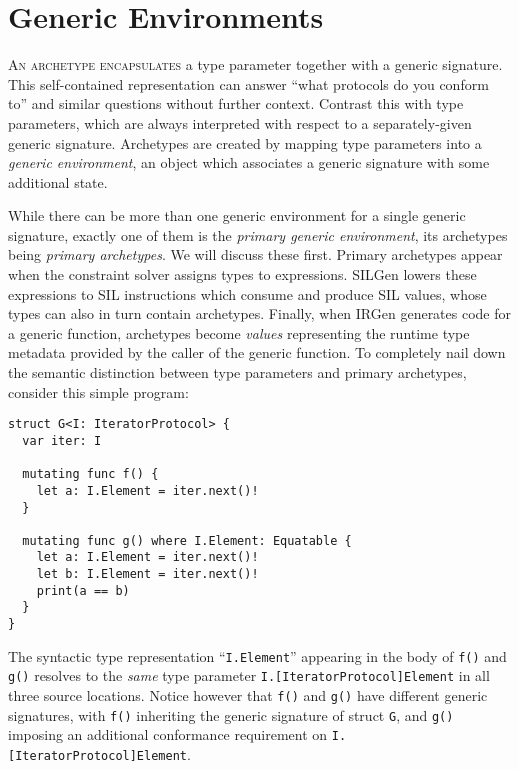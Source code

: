 \documentclass[../generics]{subfiles}
\begin{document}
\chapter{Generic Environments}\label{genericenv}

\lettrine{A}{n archetype encapsulates} a type parameter together with a generic signature. This self-contained representation can answer ``what protocols do you conform to'' and similar questions without further context. Contrast this with type parameters, which are always interpreted with respect to a separately-given generic signature. Archetypes are created by mapping type parameters into a \emph{generic environment}, an object which associates a generic signature with some additional state.

%
%
%
%
While there can be more than one generic environment for a single generic signature, exactly one of them is the \emph{primary generic environment}, its archetypes being \emph{primary archetypes}. We will discuss these first. Primary archetypes appear when the constraint solver assigns types to expressions. SILGen lowers these expressions to SIL instructions which consume and produce SIL values, whose types can also in turn contain archetypes. Finally, when IRGen generates code for a generic function, archetypes become \emph{values} representing the runtime type metadata provided by the caller of the generic function. To completely nail down the semantic distinction between type parameters and primary archetypes, consider this simple program:
\begin{Verbatim}
struct G<I: IteratorProtocol> {
  var iter: I

  mutating func f() {
    let a: I.Element = iter.next()!
  }
  
  mutating func g() where I.Element: Equatable {
    let a: I.Element = iter.next()!
    let b: I.Element = iter.next()!
    print(a == b)
  }
}
\end{Verbatim}
%
The syntactic type representation ``\texttt{I.Element}'' appearing in the body of \texttt{f()} and \texttt{g()} resolves to the \emph{same} type parameter \texttt{I.[IteratorProtocol]Element} in all three source locations. Notice however that \texttt{f()} and \texttt{g()} have different generic signatures, with \texttt{f()} inheriting the generic signature of struct \texttt{G}, and \texttt{g()} imposing an additional conformance requirement on \texttt{I.[IteratorProtocol]Element}.
\end{document}
